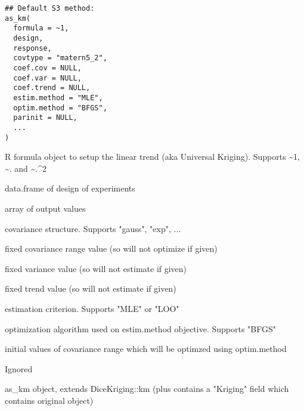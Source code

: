 \documentclass[letterpaper]{book}
\begin{document}
%
\begin{Usage}
\begin{verbatim}
## Default S3 method:
as_km(
  formula = ~1,
  design,
  response,
  covtype = "matern5_2",
  coef.cov = NULL,
  coef.var = NULL,
  coef.trend = NULL,
  estim.method = "MLE",
  optim.method = "BFGS",
  parinit = NULL,
  ...
)
\end{verbatim}
\end{Usage}
%
\begin{Arguments}
\begin{ldescription}
\item[\code{formula}] R formula object to setup the linear trend (aka Universal Kriging). Supports \textasciitilde{}1, \textasciitilde{}. and \textasciitilde{}.\textasciicircum{}2

\item[\code{design}] data.frame of design of experiments

\item[\code{response}] array of output values

\item[\code{covtype}] covariance structure. Supports "gauss", "exp", ...

\item[\code{coef.cov}] fixed covariance range value (so will not optimize if given)

\item[\code{coef.var}] fixed variance value (so will not estimate if given)

\item[\code{coef.trend}] fixed trend value (so will not estimate if given)

\item[\code{estim.method}] estimation criterion. Supports "MLE" or "LOO"

\item[\code{optim.method}] optimization algorithm used on estim.method objective. Supports "BFGS"

\item[\code{parinit}] initial values of covariance range which will be optimzed using optim.method

\item[\code{...}] Ignored
\end{ldescription}
\end{Arguments}
%
\begin{Value}
as\_km object, extends DiceKriging::km (plus contains a "Kriging" field which contains original object)
\end{Value}
\end{document}
